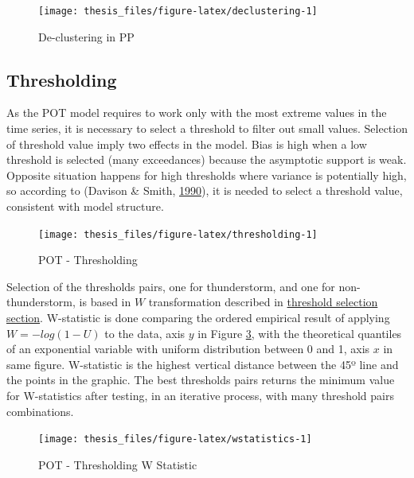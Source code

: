 \documentclass[12pt,oneside]{reedthesis}
\begin{document}
\footnotesize
\begin{figure}

{\centering \texttt{[image: thesis\_files/figure-latex/declustering-1]} 

}

\caption{De-clustering in PP}\label{fig:declustering}
\end{figure}
\normalsize

\hypertarget{thresholding}{%
\subsection{Thresholding}\label{thresholding}}

As the POT model requires to work only with the most extreme values in the time series, it is necessary to select a threshold to filter out small values. Selection of threshold value imply two effects in the model. Bias is high when a low threshold is selected (many exceedances) because the asymptotic support is weak. Opposite situation happens for high thresholds where variance is potentially high, so according to (Davison \& Smith, \protect\hyperlink{ref-Davison1990}{1990}), it is needed to select a threshold value, consistent with model structure.

\footnotesize
\begin{figure}

{\centering \texttt{[image: thesis\_files/figure-latex/thresholding-1]} 

}

\caption{POT - Thresholding}\label{fig:thresholding}
\end{figure}
\normalsize

Selection of the thresholds pairs, one for thunderstorm, and one for non-thunderstorm, is based in \(W\) transformation described in \protect\hyperlink{thresholdselection}{threshold selection section}. W-statistic is done comparing the ordered empirical result of applying \(W = -log(1-U)\) to the data, axis \(y\) in Figure \ref{fig:wstatistics}, with the theoretical quantiles of an exponential variable with uniform distribution between 0 and 1, axis \(x\) in same figure. W-statistic is the highest vertical distance between the 45º line and the points in the graphic. The best thresholds pairs returns the minimum value for W-statistics after testing, in an iterative process, with many threshold pairs combinations.

\footnotesize
\begin{figure}

{\centering \texttt{[image: thesis\_files/figure-latex/wstatistics-1]} 

}

\caption{POT - Thresholding W Statistic}\label{fig:wstatistics}
\end{figure}
\normalsize
\end{document}

